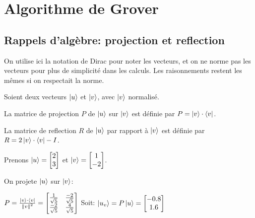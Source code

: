 \chapter{Algorithme de Grover}
\label{appendix:grover}

\section{Rappels d'algèbre: projection et reflection}
On utilise ici la notation de Dirac pour noter les vecteurs, et on ne norme pas les vecteurs pour plus de simplicité dans les calculs. Les raisonnements restent les mêmes si on respectait la norme.

Soient deux vecteurs $\ket{u}$ et $\ket{v}$, avec $\ket{v}$ normalisé.

\begin{definition}
  La matrice de projection $P$ de $\ket{u}$ sur $\ket{v}$ est définie par $P = \ket{v} \cdot \bra{v}$.
\end{definition}

\begin{definition}
  La matrice de reflection $R$ de $\ket{u}$ par rapport à $\ket{v}$ est définie par $R = 2 \ket{v} \cdot \bra{v} - I$.
\end{definition}

\begin{ex}
Prenons $\ket{u}=\begin{bmatrix}2\\3\end{bmatrix}$ et $\ket{v}=\begin{bmatrix}1\\-2\end{bmatrix}$.

On projete $\ket{u}$ sur $\ket{v}$:

$P = \frac{\ket{v} \cdot \bra{v}}{\left\lVert v\right\rVert^2} = \begin{bmatrix}\frac{1}{\sqrt{5}} & \frac{-2}{\sqrt{5}}\\\frac{-2}{\sqrt{5}} & \frac{4}{\sqrt{5}}\end{bmatrix}$
\medbreak
Soit: $\ket{u_v} = P\ket{u} = \begin{bmatrix}-0.8\\1.6\end{bmatrix}$
\end{ex}

